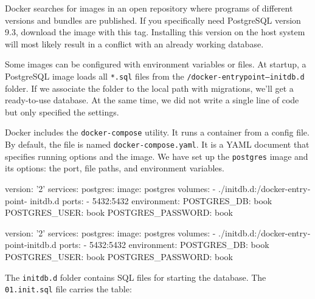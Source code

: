 Docker searches for images in an open repository where programs of different versions and bundles are published. If you specifically need PostgreSQL version 9.3, download the image with this tag. Installing this version on the host system will most likely result in a conflict with an already working database.


Some images can be configured with environment variables or files. At startup, a PostgreSQL image loads all \verb|*.sql| files from the \texttt{/docker-entrypoint--initdb.d} folder. If we associate the folder to the local path with migrations, we'll get a ready-to-use database. At the same time, we did not write a single line of code but only specified the settings.


Docker includes the \texttt{docker\--compose} utility. It runs a container from a config file. By default, the file is named \verb|docker-compose.yaml|. It is a YAML document that specifies running options and the image. We have set up the \verb|postgres| image and its options: the port, file paths, and environment variables.


\ifnarrow

\begin{english}
  \begin{yaml}
version: '2'
services:
  postgres:
    image: postgres
    volumes:
      - ./initdb.d:/docker-entrypoint-
                                initdb.d
    ports:
      - 5432:5432
    environment:
      POSTGRES_DB: book
      POSTGRES_USER: book
      POSTGRES_PASSWORD: book
  \end{yaml}
\end{english}

\else

\begin{english}
  \begin{yaml}
version: '2'
services:
  postgres:
    image: postgres
    volumes:
      - ./initdb.d:/docker-entrypoint-initdb.d
    ports:
      - 5432:5432
    environment:
      POSTGRES_DB: book
      POSTGRES_USER: book
      POSTGRES_PASSWORD: book
  \end{yaml}
\end{english}

\fi


The \verb|initdb.d| folder contains SQL files for starting the database. The \verb|01.init.sql| file carries the  table:

